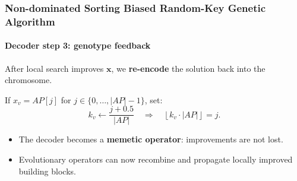\documentclass[
	11pt, %
	aspectratio=169, %
]{beamer}
\begin{document}
\begin{frame}
\frametitle{Non-dominated Sorting Biased Random-Key Genetic Algorithm}
\framesubtitle{Decoder step 3: genotype feedback}

After local search improves $\mathbf{x}$, we \textbf{re-encode} the solution back into the chromosome.

\medskip
If $x_{v} = AP[j]$ for $j \in \{0, \dots, |AP| - 1\}$, set:
\[
k_{v} \leftarrow \frac{j + 0.5}{|AP|}\quad\Rightarrow\quad \left\lfloor k_{v} \cdot |AP|\right\rfloor = j.
\]

\begin{itemize}
\item The decoder becomes a \textbf{memetic operator}: improvements are not lost.
\item Evolutionary operators can now recombine and propagate locally improved building blocks.
\end{itemize}

\end{frame}
\end{document}
